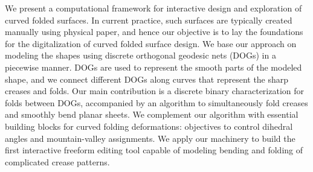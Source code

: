 We present a computational framework for interactive design and exploration of curved folded surfaces. In current practice, such surfaces are typically created manually using physical paper, and hence our objective is to lay the foundations for the digitalization of curved folded surface design.
We base our approach on modeling the shapes using discrete orthogonal geodesic nets (DOGs) in a piecewise manner. DOGs are used to represent the smooth parts of the modeled shape, and we connect different DOGs along curves that represent the sharp creases and folds. 
Our main 
contribution is a discrete binary characterization for folds between DOGs, accompanied by an algorithm to simultaneously fold creases and smoothly bend planar sheets. We complement our algorithm with essential building blocks for curved folding deformations: objectives to control dihedral angles and mountain-valley assignments. We apply our machinery to build the first interactive freeform editing tool capable of modeling bending and folding
of complicated crease patterns.